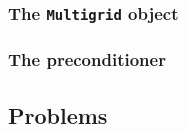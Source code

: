 \begin{frame}
  \frametitle{The \lstinline!Multigrid! object}
  \begin{block}{}
    
  \end{block}  
\end{frame}

\begin{frame}
  \frametitle{The preconditioner}
  \begin{block}{}
    
  \end{block}  
\end{frame}

\subsection{Problems}


